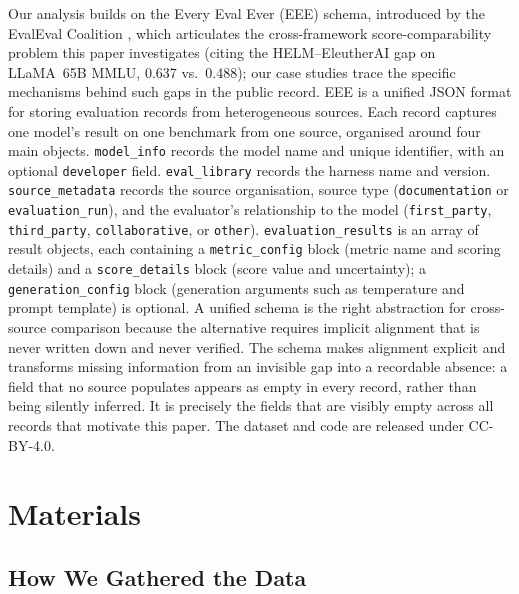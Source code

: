 \documentclass[11pt]{article}
\begin{document}
Our analysis builds on the Every Eval Ever (EEE) schema, introduced by the
EvalEval Coalition \citep{evaleval2026everyevalever}, which articulates the
cross-framework score-comparability problem this paper investigates (citing
the HELM--EleutherAI gap on LLaMA~65B MMLU, 0.637 vs.\ 0.488); our case
studies trace the specific mechanisms behind such gaps in the public record.
EEE is a unified JSON format for storing evaluation records from heterogeneous
sources. Each record captures one model's result on one benchmark from one
source, organised around four main objects. \texttt{model\_info} records the
model name and unique identifier, with an optional \texttt{developer} field.
\texttt{eval\_library} records the harness name and version.
\texttt{source\_metadata} records the source organisation, source type
(\texttt{documentation} or \texttt{evaluation\_run}), and the evaluator's
relationship to the model (\texttt{first\_party}, \texttt{third\_party},
\texttt{collaborative}, or \texttt{other}).
\texttt{evaluation\_results} is an array of result objects, each containing a
\texttt{metric\_config} block (metric name and scoring details) and a
\texttt{score\_details} block (score value and uncertainty); a
\texttt{generation\_config} block (generation arguments such as temperature and
prompt template) is optional.
A unified schema is the right abstraction for cross-source comparison because
the alternative requires implicit alignment that is never written down and never verified. The schema makes alignment explicit and transforms missing information from an invisible gap into a recordable absence: a field that no source populates appears as empty in every record, rather than being silently inferred.
It is precisely the fields that are visibly empty across all records that
motivate this paper. The dataset and code are released under CC-BY-4.0.

\section{Materials}
\label{sec:materials}

\subsection{How We Gathered the Data}
\label{sec:pipeline}
\end{document}
